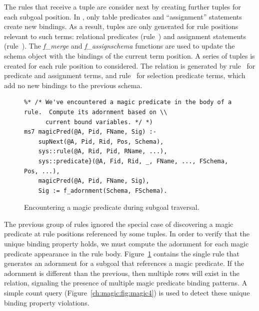 The rules that receive a  tuple are consider next by creating further
 tuples for each subgoal position.  In \OVERLOG, only table predicates
and ``assignment'' statements create new bindings.  As a result, 
tuples are only generated for rule positions relevant to such terms: relational
predicates (rule~) and assignment statements (rule~).  The
{\em f\_merge} and {\em f\_assignschema} functions are used to update the
schema object with the bindings of the current term position.  A series of
 tuples is created for each rule position to considered.  The
 relation is generated by rule~ for predicate and
assignment terms, and rule~ for selection predicate terms, which add no
new bindings to the previous schema.


\begin{figure}[!t]
\ssp
\centering
\begin{lstlisting}
%* /* We've encountered a magic predicate in the body of a rule.  Compute its adornment based on \\
      current bound variables. */ *)
ms7 magicPred(@A, Pid, FName, Sig) :-
    supNext(@A, Pid, Rid, Pos, Schema),
    sys::rule(@A, Rid, Pid, RName, ...),
    sys::predicate}(@A, Fid, Rid, _, FName, ..., FSchema, Pos, ...),
    magicPred(@A, Pid, FName, Sig),
    Sig := f_adornment(Schema, FSchema).
\end{lstlisting}
\caption{\label{ch:magic:fig:magic3}Encountering a magic predicate during subgoal traversal.}
\end{figure}

The previous group of rules ignored the special case of discovering a magic
predicate at rule positions referenced by some  tuples.  In order
to verify that the unique binding property holds, we must compute the adornment
for each magic predicate appearance in the rule body.
Figure~\ref{ch:magic:fig:magic3} contains the single rule that generates an
adornment for a subgoal that references a magic predicate.  If the adornment is
different than the previous, then multiple rows will exist in the
 relation, signaling the presence of multiple magic predicate
binding patterns.  A simple count query (Figure~\ref{ch:magic:fig:magic4}) is
used to detect these unique binding property violations.


